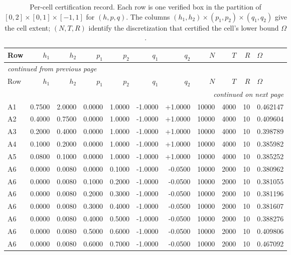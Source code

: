 \documentclass{article}
\begin{document}
\footnotesize
\setlength{\tabcolsep}{4pt}
\begin{longtable}{l r r r r r r r r r l}
\caption{Per-cell certification record. Each row is one verified box
in the partition of $[0,2]\times[0,1]\times[-1,1]$ for
$(h,p,q)$. The columns $(h_1, h_2)\times(p_1, p_2)\times(q_1, q_2)$
give the cell extent; $(N, T, R)$ identify the discretization that
certified the cell's lower bound $\Omega$.}\label{tab:cells} \\
\toprule
Row & $h_1$ & $h_2$ & $p_1$ & $p_2$ & $q_1$ & $q_2$ & $N$ & $T$ & $R$ & $\Omega$ \\
\midrule
\endfirsthead
\multicolumn{11}{l}{\footnotesize\itshape continued from previous page} \\
\toprule
Row & $h_1$ & $h_2$ & $p_1$ & $p_2$ & $q_1$ & $q_2$ & $N$ & $T$ & $R$ & $\Omega$ \\
\midrule
\endhead
\midrule \multicolumn{11}{r}{\footnotesize\itshape continued on next page} \\
\endfoot
\bottomrule
\endlastfoot
A1 & 0.7500 & 2.0000 & 0.0000 & 1.0000 & -1.0000 & +1.0000 & 10000 & 4000 & 10 & 0.462147 \\
A2 & 0.4000 & 0.7500 & 0.0000 & 1.0000 & -1.0000 & +1.0000 & 10000 & 4000 & 10 & 0.409604 \\
A3 & 0.2000 & 0.4000 & 0.0000 & 1.0000 & -1.0000 & +1.0000 & 10000 & 4000 & 10 & 0.398789 \\
A4 & 0.1000 & 0.2000 & 0.0000 & 1.0000 & -1.0000 & +1.0000 & 10000 & 4000 & 10 & 0.385982 \\
A5 & 0.0800 & 0.1000 & 0.0000 & 1.0000 & -1.0000 & +1.0000 & 10000 & 4000 & 10 & 0.385252 \\
A6 & 0.0000 & 0.0080 & 0.0000 & 0.1000 & -1.0000 & -0.0500 & 10000 & 2000 & 10 & 0.380962 \\
A6 & 0.0000 & 0.0080 & 0.1000 & 0.2000 & -1.0000 & -0.0500 & 10000 & 2000 & 10 & 0.381055 \\
A6 & 0.0000 & 0.0080 & 0.2000 & 0.3000 & -1.0000 & -0.0500 & 10000 & 2000 & 10 & 0.381196 \\
A6 & 0.0000 & 0.0080 & 0.3000 & 0.4000 & -1.0000 & -0.0500 & 10000 & 2000 & 10 & 0.381607 \\
A6 & 0.0000 & 0.0080 & 0.4000 & 0.5000 & -1.0000 & -0.0500 & 10000 & 2000 & 10 & 0.388276 \\
A6 & 0.0000 & 0.0080 & 0.5000 & 0.6000 & -1.0000 & -0.0500 & 10000 & 2000 & 10 & 0.409806 \\
A6 & 0.0000 & 0.0080 & 0.6000 & 0.7000 & -1.0000 & -0.0500 & 10000 & 2000 & 10 & 0.467092 \\

\end{longtable}
\end{document}
